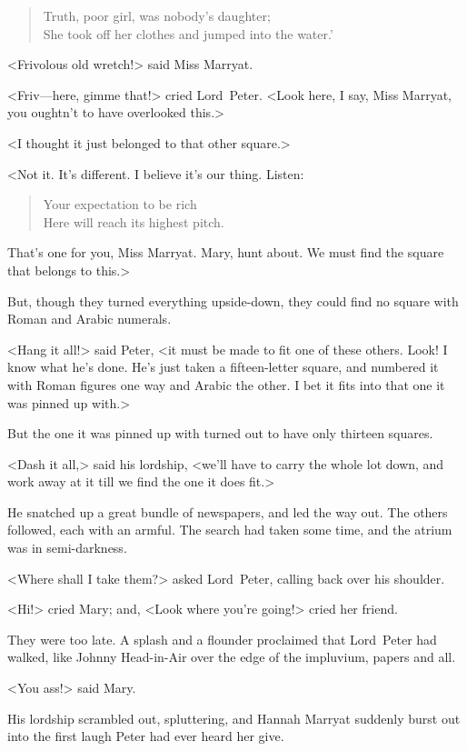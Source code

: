 \begin{verse}
Truth, poor girl, was nobody's daughter;\\
She took off her clothes and jumped into the water.'
\end{verse}

<Frivolous old wretch!> said Miss Marryat.

<Friv—here, gimme that!> cried Lord~Peter. <Look here, I say, Miss Marryat, you oughtn't to have overlooked this.>

<I thought it just belonged to that other square.>

<Not it. It's different. I believe it's our thing. Listen:

\begin{verse}
Your expectation to be rich\\
Here will reach its highest pitch.\\
\end{verse}

That's one for you, Miss Marryat. Mary, hunt about. We must find the square that belongs to this.>

But, though they turned everything upside-down, they could find no square with Roman and Arabic numerals.

<Hang it all!> said Peter, <it must be made to fit one of these others. Look! I know what he's done. He's just taken a fifteen-letter square, and numbered it with Roman figures one way and Arabic the other. I bet it fits into that one it was pinned up with.>

But the one it was pinned up with turned out to have only thirteen squares.

<Dash it all,> said his lordship, <we'll have to carry the whole lot down, and work away at it till we find the one it does fit.>

He snatched up a great bundle of newspapers, and led the way out. The others followed, each with an armful. The search had taken some time, and the atrium was in semi-darkness.

<Where shall I take them?> asked Lord~Peter, calling back over his shoulder.

<Hi!> cried Mary; and, <Look where you're going!> cried her friend.

They were too late. A splash and a flounder proclaimed that Lord~Peter had walked, like Johnny Head-in-Air over the edge of the impluvium, papers and all.

<You ass!> said Mary.

His lordship scrambled out, spluttering, and Hannah Marryat suddenly burst out into the first laugh Peter had ever heard her give.

